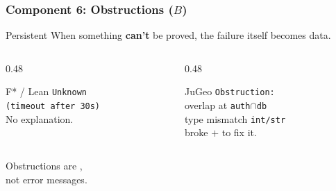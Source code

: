 \begin{frame}
\frametitle{Component 6: Obstructions ($B$)}
\begin{block}{Persistent }
  When something \textbf{can't} be proved, the failure itself becomes data.
\end{block}
\vspace{4pt}
\begin{columns}[T]
\begin{column}{0.48\textwidth}
\begin{alertblock}{F* / Lean}
  \centering
  \texttt{Unknown}\\[4pt]
  \texttt{(timeout after 30s)}\\[8pt]
  {\footnotesize No explanation.}
\end{alertblock}
\end{column}
\begin{column}{0.48\textwidth}
\begin{exampleblock}{JuGeo}
  \centering
  \texttt{Obstruction:}\\[2pt]
  {\footnotesize overlap at \texttt{auth$\cap$db}}\\
  {\footnotesize type mismatch \texttt{int/str}}\\[4pt]
  {\footnotesize {} broke $+$  to fix it.}
\end{exampleblock}
\end{column}
\end{columns}
\vspace{6pt}
\begin{center}
  {\small Obstructions are ,\\
   not error messages.}
\end{center}
\end{frame}

